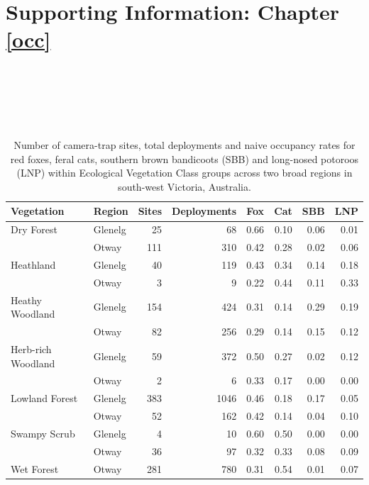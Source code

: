 \documentclass[11pt,a4paper,titlepage,twoside,openright]{style/unimelbthesis}
\begin{document}
\begin{mainmatter}
\newpage



\hypertarget{occ-app}{%
\chapter{Supporting Information: Chapter \ref{occ}}\label{occ-app}}

\newpage

\(~\)

\(~\)

\(~\)

\begingroup\fontsize{10}{12}\selectfont
\begin{longtable}[t]{llrrrrrr}
\caption{\label{tab:occ-naive}Number of camera-trap sites, total deployments and naive occupancy rates for red foxes, feral cats, southern brown bandicoots (SBB) and long-nosed potoroos (LNP) within Ecological Vegetation Class groups across two broad regions in south-west Victoria, Australia.}\\
\toprule
Vegetation & Region & Sites & Deployments & Fox & Cat & SBB & LNP\\
\midrule
Dry Forest & Glenelg & 25 & 68 & 0.66 & 0.10 & 0.06 & 0.01\\
 & Otway & 111 & 310 & 0.42 & 0.28 & 0.02 & 0.06\\
Heathland & Glenelg & 40 & 119 & 0.43 & 0.34 & 0.14 & 0.18\\
 & Otway & 3 & 9 & 0.22 & 0.44 & 0.11 & 0.33\\
Heathy Woodland & Glenelg & 154 & 424 & 0.31 & 0.14 & 0.29 & 0.19\\
\addlinespace
 & Otway & 82 & 256 & 0.29 & 0.14 & 0.15 & 0.12\\
Herb-rich Woodland & Glenelg & 59 & 372 & 0.50 & 0.27 & 0.02 & 0.12\\
 & Otway & 2 & 6 & 0.33 & 0.17 & 0.00 & 0.00\\
Lowland Forest & Glenelg & 383 & 1046 & 0.46 & 0.18 & 0.17 & 0.05\\
 & Otway & 52 & 162 & 0.42 & 0.14 & 0.04 & 0.10\\
\addlinespace
Swampy Scrub & Glenelg & 4 & 10 & 0.60 & 0.50 & 0.00 & 0.00\\
 & Otway & 36 & 97 & 0.32 & 0.33 & 0.08 & 0.09\\
Wet Forest & Otway & 281 & 780 & 0.31 & 0.54 & 0.01 & 0.07\\
\bottomrule
\end{longtable}
\endgroup{}


\end{mainmatter}
\end{document}
